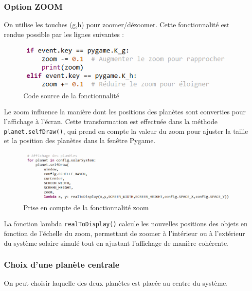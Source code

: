 \documentclass[a4paper, 12pt]{article}
\begin{document}
\subsubsection{Option ZOOM}
On utilise les touches (g,h) pour zoomer/dézoomer. Cette fonctionnalité est rendue possible par les lignes suivantes :

	\begin{figure}[H]
		\centering
		\includegraphics[width=0.3\linewidth]{img/optionZoom.png}
		\caption{\label{fig: Source} Code source de la fonctionnalité}  
	\end{figure}

Le zoom influence la manière dont les positions des planètes sont converties pour l'affichage à l'écran. Cette transformation est effectuée dans la méthode \texttt{planet.selfDraw()}, qui prend en compte la valeur du zoom pour ajuster la taille et la position des planètes dans la fenêtre Pygame.

	\begin{figure}[H]
		\centering
		\includegraphics[width=0.4\linewidth]{img/priseEnCompte.png}
		\caption{\label{fig: priseEnCompte} Prise en compte de la fonctionnalité zoom}  
	\end{figure}
	
La fonction lambda \texttt{realToDisplay()} calcule les nouvelles positions des objets en fonction de l'échelle du zoom, permettant de zoomer à l'intérieur ou à l'extérieur du système solaire simulé tout en ajustant l'affichage de manière cohérente. 

\subsubsection{Choix d'une planète centrale}
On peut choisir laquelle des deux planètes est placée au centre du système.
\end{document}
